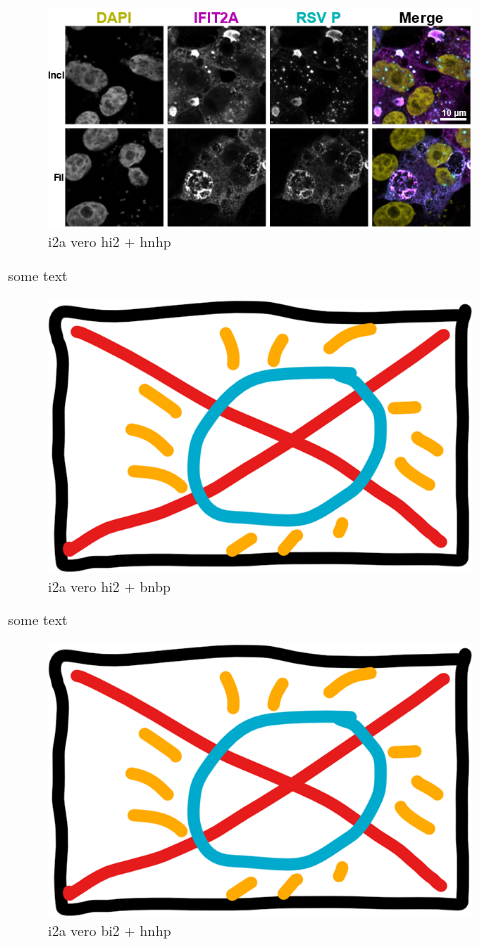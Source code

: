 \begin{figure}
    \centering
    \includegraphics[width=1\linewidth]{09. Chapter 4//Figs//01. I2A/03. i2a vero hi2 hnhp.png}
    \caption[i2a vero hi2 + hnhp]{i2a vero hi2 + hnhp}
    \label{i2a vero hi2 + hnhp}
\end{figure}

some text

\begin{figure}
    \centering
    \includegraphics[width=0.5\linewidth]{09. Chapter 4//Figs//01. I2A/00. placeholder.png}
    \caption[i2a vero hi2 + bnbp]{i2a vero hi2 + bnbp}
    \label{i2a vero hi2 + bnbp}
\end{figure}

some text

\begin{figure}
    \centering
    \includegraphics[width=0.5\linewidth]{09. Chapter 4//Figs//01. I2A/00. placeholder.png}
    \caption[i2a vero bi2 + hnhp]{i2a vero bi2 + hnhp}
    \label{i2a vero bi2 + hnhp}
\end{figure}


